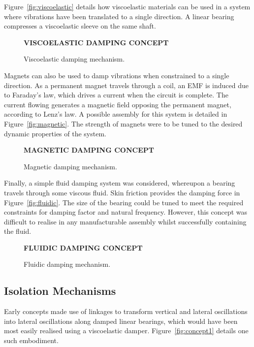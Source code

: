 \documentclass{article}
\begin{document}
Figure~\vref{fig:viscoelastic} details how viscoelastic materials can be used 
in a system where vibrations have been translated to a single direction. A 
linear bearing compresses a viscoelastic sleeve on the same shaft.

\begin{figure}[h] 
    \centering
    \textbf{VISCOELASTIC DAMPING CONCEPT}
    \caption{Viscoelastic damping mechanism.}
    \label{fig:viscoelastic}
\end{figure}

Magnets can also be used to damp vibrations when constrained to a single 
direction. As a permanent magnet travels through a coil, an EMF is induced due 
to Faraday's law, which drives a current when the circuit is complete. The 
current flowing generates a magnetic field opposing the permanent magnet, 
according to Lenz's law. A possible assembly for this system is detailed in 
Figure~\vref{fig:magnetic}. The strength of magnets were to be tuned to the 
desired dynamic properties of the system.

\begin{figure}[h] 
    \centering
    \textbf{MAGNETIC DAMPING CONCEPT}
    \caption{Magnetic damping mechanism.}
    \label{fig:magnetic}
\end{figure}

Finally, a simple fluid damping system was considered, whereupon a bearing 
travels through some viscous fluid. Skin friction provides the damping force in 
Figure~\vref{fig:fluidic}. The size of the bearing could be tuned to meet the 
required constraints for damping factor and natural frequency. However, this 
concept was difficult to realise in any manufacturable assembly whilst 
successfully containing the fluid.

\begin{figure}[h] 
    \centering
    \textbf{FLUIDIC DAMPING CONCEPT}
    \caption{Fluidic damping mechanism.}
    \label{fig:fluidic}
\end{figure}

\subsection{Isolation Mechanisms}

Early concepts made use of linkages to transform vertical and lateral 
oscillations into lateral oscillations along damped linear bearings, which 
would have been most easily realised using a viscoelastic damper. 
Figure~\vref{fig:concept1} details one such embodiment.
\end{document}

